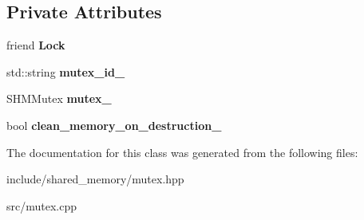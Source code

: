 \subsection*{Private Attributes}
\begin{DoxyCompactItemize}
\item 
\mbox{\label{classshared__memory_1_1Mutex_ac8f2675b262549f321f417323cf0702a}} 
friend {\bfseries Lock}
\item 
\mbox{\label{classshared__memory_1_1Mutex_a2ab98408f60b14b160fae683b1a88977}} 
std\+::string {\bfseries mutex\+\_\+id\+\_\+}
\item 
\mbox{\label{classshared__memory_1_1Mutex_afc39f23ad6cfe9db45dd2de177a1ede1}} 
S\+H\+M\+Mutex {\bfseries mutex\+\_\+}
\item 
\mbox{\label{classshared__memory_1_1Mutex_a065ff25889e198e37021504fbe5feac8}} 
bool {\bfseries clean\+\_\+memory\+\_\+on\+\_\+destruction\+\_\+}
\end{DoxyCompactItemize}


The documentation for this class was generated from the following files\+:\begin{DoxyCompactItemize}
\item 
include/shared\+\_\+memory/mutex.\+hpp\item 
src/mutex.\+cpp\end{DoxyCompactItemize}
